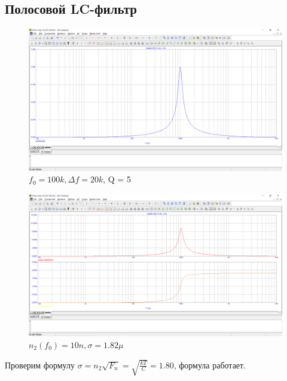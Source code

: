 \documentclass[a4paper, 12pt]{article}%
\begin{document}
\subsection{Полосовой LC-фильтр}

\begin{figure}[h!]
    \centering
    \includegraphics[scale = 0.4 \textwidth]{images/mod3_2_1.png}
    \caption{$f_0 = 100k, \Delta f = 20k$, Q = 5}
    \label{fig:m321}
\end{figure}

\begin{figure}[h!]
    \centering
    \includegraphics[scale = 0.4 \textwidth]{images/mod3_2_2.png}
    \caption{$n_2(f_0) = 10n, \sigma = 1.82\mu$}
    \label{fig:m322}
\end{figure}

Проверим формулу $\sigma = n_2\sqrt{F_n} = \sqrt{\frac{kT}{C}} = 1.80$, формула работает.
\end{document}
